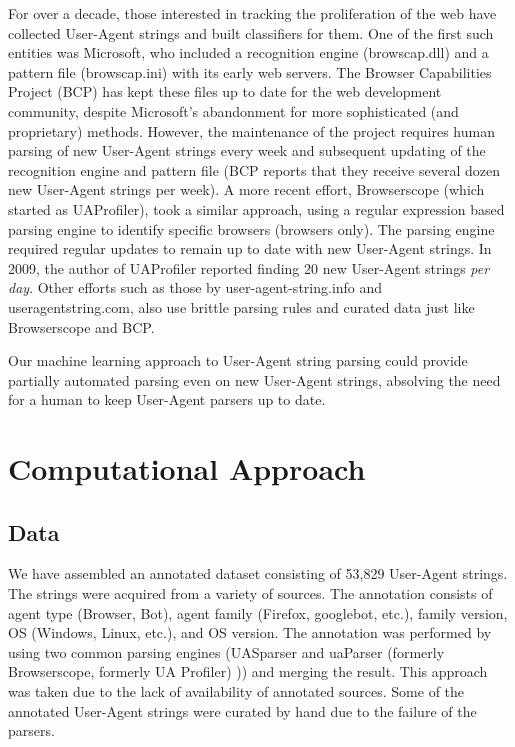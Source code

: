 \documentclass[10pt]{article}
\begin{document}
For over a decade, those interested in tracking the proliferation of the web have collected User-Agent strings and built classifiers for them.  One of the first such entities was Microsoft, who included a recognition engine (browscap.dll) and a pattern file (browscap.ini) with its early web servers.\cite{bcp}  The Browser Capabilities Project (BCP) has kept these files up to date for the web development community, despite Microsoft's abandonment for more sophisticated (and proprietary) methods.\cite{bcp}  However, the maintenance of the project requires human parsing of new User-Agent strings every week and subsequent updating of the recognition engine and pattern file (BCP reports that they receive several dozen new User-Agent strings per week).  A more recent effort, Browserscope (which started as UAProfiler), took a similar approach, using a regular expression based parsing engine to identify specific browsers (browsers only). \cite{souders}  The parsing engine required regular updates to remain up to date with new User-Agent strings.  In 2009, the author of UAProfiler reported finding 20 new User-Agent strings {\it per day}. \cite{souders2}  Other efforts such as those by user-agent-string.info and useragentstring.com, also use brittle parsing rules and curated data just like Browserscope and BCP.  \cite{uas.info,uas.com}   

Our machine learning approach to User-Agent string parsing could provide partially automated parsing even on new User-Agent strings, absolving the need for a human to keep User-Agent parsers up to date.      

\section{Computational Approach}
\subsection{Data}
We have assembled an annotated dataset consisting of 53,829 User-Agent strings.  The strings were acquired from a variety of sources.\cite{ua.org,uatracker,uas.info}  The annotation consists of agent type (Browser, Bot), agent family (Firefox, googlebot, etc.), family version, OS (Windows, Linux, etc.), and OS version.  The annotation was performed by using two common parsing engines (UASparser\cite{uas.info} and uaParser (formerly Browserscope, formerly UA Profiler)\cite{uaParser} )) and merging the result.  This approach was taken due to the lack of availability of annotated sources.  Some of the annotated User-Agent strings were curated by hand due to the failure of the parsers.
\end{document}
